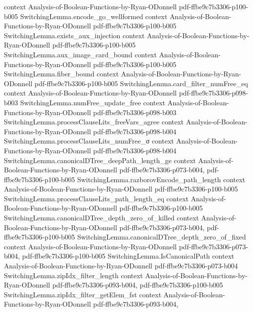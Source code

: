 \begin{lemma}
  {context}
  {Analysis-of-Boolean-Functions-by-Ryan-ODonnell}
  {pdf-ffbe9c7b3306-p100-b005}
\proofstep
  {SwitchingLemma.encode_go_wellformed}
  {context}
  {Analysis-of-Boolean-Functions-by-Ryan-ODonnell}
  {pdf-ffbe9c7b3306-p100-b005}
\proofstep
  {SwitchingLemma.exists_aux_injection}
  {context}
  {Analysis-of-Boolean-Functions-by-Ryan-ODonnell}
  {pdf-ffbe9c7b3306-p100-b005}
\proofstep
  {SwitchingLemma.aux_image_card_bound}
  {context}
  {Analysis-of-Boolean-Functions-by-Ryan-ODonnell}
  {pdf-ffbe9c7b3306-p100-b005}
\proofstep
  {SwitchingLemma.fiber_bound}
  {context}
  {Analysis-of-Boolean-Functions-by-Ryan-ODonnell}
  {pdf-ffbe9c7b3306-p100-b005}
\proofstep
  {SwitchingLemma.card_filter_numFree_eq}
  {context}
  {Analysis-of-Boolean-Functions-by-Ryan-ODonnell}
  {pdf-ffbe9c7b3306-p098-b003}
\proofstep
  {SwitchingLemma.numFree_update_free}
  {context}
  {Analysis-of-Boolean-Functions-by-Ryan-ODonnell}
  {pdf-ffbe9c7b3306-p098-b003}
\proofstep
  {SwitchingLemma.processClauseLits_freeVars_agree}
  {context}
  {Analysis-of-Boolean-Functions-by-Ryan-ODonnell}
  {pdf-ffbe9c7b3306-p098-b004}
\proofstep
  {SwitchingLemma.processClauseLits_numFree_σ}
  {context}
  {Analysis-of-Boolean-Functions-by-Ryan-ODonnell}
  {pdf-ffbe9c7b3306-p098-b004}
\proofstep
  {SwitchingLemma.canonicalDTree_deepPath_length_ge}
  {context}
  {Analysis-of-Boolean-Functions-by-Ryan-ODonnell}
  {pdf-ffbe9c7b3306-p073-b004,
    pdf-ffbe9c7b3306-p100-b005}
\proofstep
  {SwitchingLemma.razborovEncode_path_length}
  {context}
  {Analysis-of-Boolean-Functions-by-Ryan-ODonnell}
  {pdf-ffbe9c7b3306-p100-b005}
\proofstep
  {SwitchingLemma.processClauseLits_path_length_eq}
  {context}
  {Analysis-of-Boolean-Functions-by-Ryan-ODonnell}
  {pdf-ffbe9c7b3306-p100-b005}
\proofstep
  {SwitchingLemma.canonicalDTree_depth_zero_of_killed}
  {context}
  {Analysis-of-Boolean-Functions-by-Ryan-ODonnell}
  {pdf-ffbe9c7b3306-p073-b004,
    pdf-ffbe9c7b3306-p100-b005}
\proofstep
  {SwitchingLemma.canonicalDTree_depth_zero_of_fixed}
  {context}
  {Analysis-of-Boolean-Functions-by-Ryan-ODonnell}
  {pdf-ffbe9c7b3306-p073-b004,
    pdf-ffbe9c7b3306-p100-b005}
\proofstep
  {SwitchingLemma.IsCanonicalPath}
  {context}
  {Analysis-of-Boolean-Functions-by-Ryan-ODonnell}
  {pdf-ffbe9c7b3306-p073-b004}
\proofstep
  {SwitchingLemma.zipIdx_filter_length}
  {context}
  {Analysis-of-Boolean-Functions-by-Ryan-ODonnell}
  {pdf-ffbe9c7b3306-p093-b004,
    pdf-ffbe9c7b3306-p100-b005}
\proofstep
  {SwitchingLemma.zipIdx_filter_getElem_fst}
  {context}
  {Analysis-of-Boolean-Functions-by-Ryan-ODonnell}
  {pdf-ffbe9c7b3306-p093-b004,
}
\end{lemma}
